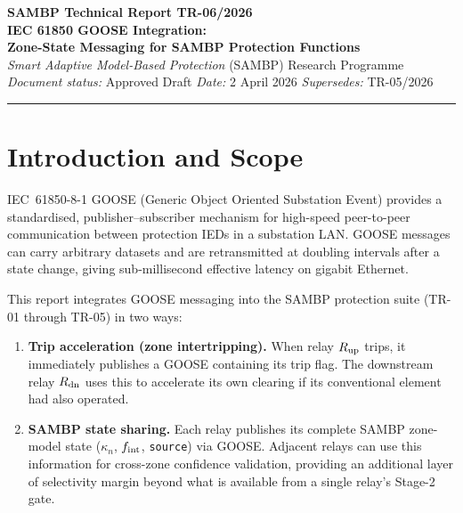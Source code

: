 \documentclass[12pt,a4paper]{article}
\newcommand{\kn}{\kappa_n}
\newcommand{\fint}{f_{\rm int}}
\begin{document}

\begin{center}
  {\Large\bfseries SAMBP Technical Report TR-06/2026}\\[6pt]
  {\large\bfseries IEC 61850 GOOSE Integration:\\
   Zone-State Messaging for SAMBP Protection Functions}\\[10pt]
  {\normalsize
    \textit{Smart Adaptive Model-Based Protection} (SAMBP) Research Programme}\\[4pt]
  {\small\textit{Document status:} Approved Draft \quad
         \textit{Date:} 2 April 2026 \quad
         \textit{Supersedes:} TR-05/2026}\\[2pt]
  \rule{\linewidth}{0.6pt}
\end{center}

\tableofcontents
\listoftables
\listoffigures
\newpage

\section{Introduction and Scope}

IEC~61850-8-1 GOOSE (Generic Object Oriented Substation Event) provides
a standardised, publisher--subscriber mechanism for high-speed
peer-to-peer communication between protection IEDs in a substation LAN.
GOOSE messages can carry arbitrary datasets and are retransmitted at
doubling intervals after a state change, giving sub-millisecond
effective latency on gigabit Ethernet.

This report integrates GOOSE messaging into the SAMBP protection suite
(TR-01 through TR-05) in two ways:

\begin{enumerate}
  \item \textbf{Trip acceleration (zone intertripping).}  When relay
    $R_{\rm up}$ trips, it immediately publishes a GOOSE containing its
    trip flag.  The downstream relay $R_{\rm dn}$ uses this to
    accelerate its own clearing if its conventional element had also
    operated.

  \item \textbf{SAMBP state sharing.}  Each relay publishes its complete
    SAMBP zone-model state ($\kn$, $\fint$, \texttt{source}) via GOOSE.
    Adjacent relays can use this information for cross-zone confidence
    validation, providing an additional layer of selectivity margin
    beyond what is available from a single relay's Stage-2 gate.
\end{enumerate}
\end{document}
